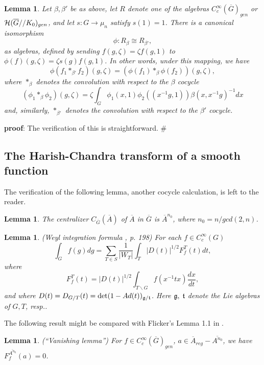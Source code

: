 \documentclass[twocolumn,10pt]{article}
\newtheorem{lemma}[theorem]{Lemma}
\begin{document}
\begin{lemma} 
\label{lemma:isomorphic}
Let $\beta,\beta'$ be as above, let $R$ denote one of 
the algebras $C_c^\infty(\overline{G})_{gen}$ or
${\cal H}(\overline{G}//K_0)_{gen}$,
and let $s:G\rightarrow \mu_n$ satisfy $s(1)=1$.
There is a canonical isomorphism
\[
\phi:R_\beta\cong R_{\beta'},
\]
as algebras, defined by sending 
$f(g,\zeta)=\zeta f(g,1)$ to
$\phi(f)(g,\zeta)=\zeta s(g) f(g,1)$. In other words,
under this mapping, we have
\[
\phi(f_1*_{\beta'} f_2)(g,\zeta)
=(\phi(f_1)*_{\beta}\phi(f_2))(g,\zeta),
\]
where $*_\beta$ denotes the convolution
with respect to the $\beta$ cocycle
\[
(\phi_1*_\beta \phi_2)(g,\zeta)
=\zeta \int_{G}\phi_1(x,1)\phi_2((x^{-1}g,1))
\beta(x,x^{-1}g)^{-1} dx
\]
and, similarly, $*_{\beta'}$ denotes the convolution
with respect to the $\beta'$ cocycle.
\end{lemma}

{\bf proof}: The verification of this
is straightforward.      $\#$

\subsection{The Harish-Chandra transform of a smooth 
function}

The verification of the following lemma, another cocycle 
calculation, is left to the reader.

\begin{lemma}
The centralizer 
$C_{\overline{G}}(\overline{A})$ of $\overline{A}$
in $\overline{G}$ is $\overline{A}^{n_0}$,
where $n_0=n/gcd(2,n)$.
\end{lemma}

\begin{lemma}
(Weyl integration formula \cite{S}, p. 198) For each
$f\in C_c^\infty (G)$
\[
\int_{G}f(g)dg=\sum_{T\in S}\frac
1{|W_T|}\int_T|D(t)|^{1/2}F_f^T(t)dt,
\]
where 
\[
F_f^T(t)=|D(t)|^{1/2}\int_{T\backslash G}f(x^{-1}tx)\frac{dx}{dt},
\]
and where $D(t)=D_{G/T}(t)=\det (1-Ad(t))_{{\frak g}/{\frak t}}$.
Here ${\frak g},\;{\frak t}$ denote the Lie algebras of $G,T$, resp..
\label{lemma:weylint}
\end{lemma}

The following result might be compared with
Flicker's Lemma 1.1 in \cite{F}.

\begin{lemma} (``Vanishing lemma'')
For $f\in C_c^\infty (\overline{G})_{gen}$,
$a\in \overline{A}_{reg}-\overline{A^{n_0}}$,
we have $F_f^{\overline{A^{n_0}}}(a)=0$.
\label{lemma:141}
\end{lemma}
\end{document}
